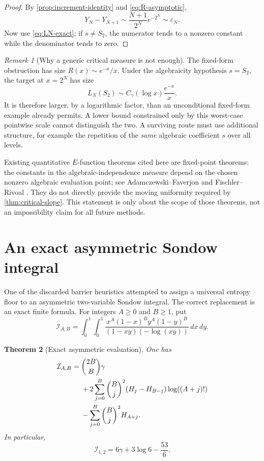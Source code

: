 \documentclass[11pt]{article}
\theoremstyle{keio}
\newtheorem{theorem}{Theorem}[section]
\theoremstyle{definition}
\theoremstyle{remark}
\newtheorem{remark}[theorem]{Remark}
\begin{document}
\begin{proof}
By \cref{prop:increment-identity} and \eqref{eq:R-asymptotic},
\[
 Y_N-Y_{N+1}\sim\frac{N+1}{2^N}e^{-2^N}
 \sim\varepsilon_N.
\]
Now use \eqref{eq:LN-exact}; if \(s\ne S_2\), the numerator tends to a
nonzero constant while the denominator tends to zero.
\end{proof}

\begin{remark}[Why a generic critical measure is not enough]
The fixed-form obstruction has size \(R(x)\sim e^{-x}/x\).  Under the
algebraicity hypothesis \(s=S_2\), the target at \(x=2^N\) has size
\[
 L_N(S_2)\sim C_\gamma(\log x)\frac{e^{-x}}x.
\]
It is therefore larger, by a logarithmic factor, than an unconditional
fixed-form example already permits.  A lower bound constrained only by this
worst-case pointwise scale cannot distinguish the two.  A surviving route
must use additional structure, for example the repetition of the \emph{same}
algebraic coefficient \(s\) over all levels.
\end{remark}

Existing quantitative \(E\)-function theorems cited here are fixed-point
theorems: the constants in the algebraic-independence measure depend on the
chosen nonzero algebraic evaluation point; see
Adamczewski--Faverjon \cite{AdamczewskiFaverjon2025} and
Fischler--Rivoal \cite{FischlerRivoal2024}.  They do not directly provide
the moving uniformity required by \cref{thm:critical-slope}.  This statement
is only about the scope of those theorems, not an impossibility claim for all
future methods.

\section{An exact asymmetric Sondow integral}
\label{sec:sondow}

One of the discarded barrier heuristics attempted to assign a universal
entropy floor to an asymmetric two-variable Sondow integral.  The correct
replacement is an exact finite formula.  For integers \(A\ge0\) and
\(B\ge1\), put
\begin{equation}\label{eq:Sondow-AB}
 \mathcal I_{A,B}=
 \int_0^1\!\!\int_0^1
 \frac{x^A(1-x)^B y^A(1-y)^B}
 {(1-xy)(-\log(xy))}\,dx\,dy.
\end{equation}

\begin{theorem}[Exact asymmetric evaluation]
\label{thm:Sondow-asymmetric}
One has
\begin{align}
 \mathcal I_{A,B}
 ={}&\binom{2B}{B}\gamma\notag\\
 &+2\sum_{j=0}^B\binom Bj^2
 (H_j-H_{B-j})\log((A+j)!)\notag\\
 &-\sum_{j=0}^B\binom Bj^2H_{A+j}.
 \label{eq:Sondow-exact}
\end{align}
In particular,
\begin{equation}\label{eq:Sondow-example}
 \mathcal I_{1,2}=6\gamma+3\log6-\frac{53}{6}.
\end{equation}
\end{theorem}
\end{document}
